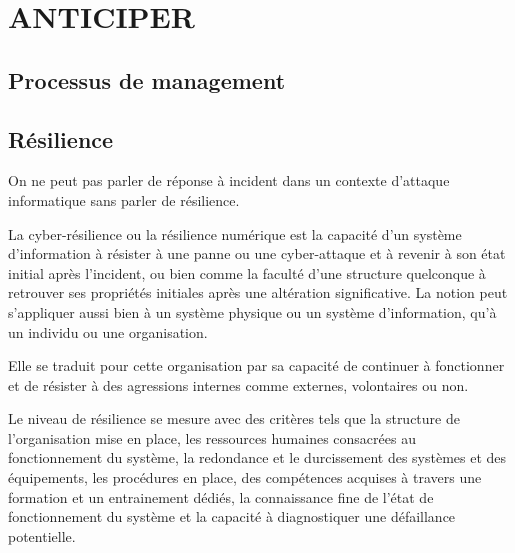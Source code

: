 %
%


\section{ANTICIPER}

\subsection{Processus de management} 

\subsection{Résilience}
 
 On ne peut pas parler de réponse à incident dans un contexte d'attaque informatique sans parler de résilience.
 
La cyber-résilience ou la résilience numérique est la capacité d’un système d’information à résister à une panne ou une cyber-attaque et à revenir à son état initial après l’incident, ou bien comme la faculté d’une structure quelconque à retrouver ses propriétés initiales après une altération significative. La notion peut s’appliquer aussi bien à un système physique ou un système d'information, qu’à un individu ou une organisation. 

Elle se traduit pour cette organisation par sa capacité de continuer à fonctionner et de résister à des agressions internes comme externes, volontaires ou non.

 Le niveau de résilience se mesure  avec des critères tels que la structure de l’organisation mise en place, les ressources humaines consacrées au fonctionnement du système, la redondance et le durcissement des systèmes et des équipements, les procédures en place, des compétences acquises à travers une formation et un entrainement dédiés, la connaissance fine de l’état de fonctionnement du système et la capacité à diagnostiquer une défaillance potentielle.
 
